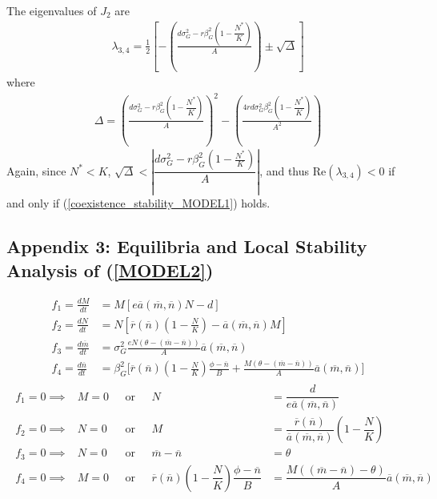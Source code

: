 \documentclass{amsart}
\theoremstyle{definition}
\theoremstyle{remark}
\numberwithin{equation}{section}
\begin{document}
\noindent The eigenvalues of $J_2$ are
\begin{align*}
	\lambda_{3,4} = \frac{1}{2}\left[-\left(\frac{d\sigma_G^2 - r\beta_G^2\left(1 - \dfrac{N^*}{K}\right)}{A}\right) \pm \sqrt{\Delta}\right]
\end{align*}
where
\begin{align*}
	\Delta = \left(\frac{d\sigma_G^2 - r\beta_G^2\left(1 - \dfrac{N^*}{K}\right)}{A}\right)^2 - \left(\frac{4rd\sigma_G^2\beta_G^2\left(1 - \dfrac{N^*}{K}\right)}{A^2}\right)
\end{align*}
Again, since $N^* < K$, $\sqrt{\Delta} < \left|\dfrac{d\sigma_G^2 - r\beta_G^2\left(1 - \frac{N^*}{K}\right)}{A}\right|$, and thus $\text{Re}(\lambda_{3,4}) < 0$ if and only if (\ref{coexistence_stability_MODEL1}) holds.

\pagebreak
\subsection{Appendix 3: Equilibria and Local Stability Analysis of (\ref{MODEL2})}
\begin{align*}
	f_1 = \frac{dM}{dt} &= M\left[e\overline{a}(\overline{m}, \overline{n})N - d\right] \\[5px]
	f_2 = \frac{dN}{dt} &= N\left[\overline{r}(\overline{n})\left(1 - \frac{N}{K}\right) - \overline{a}(\overline{m}, \overline{n})M\right] \\[5px]
	f_3 = \frac{d\overline{m}}{dt} &= \sigma_{G}^2\frac{eN(\theta - (\overline{m} - \overline{n}))}{A}\overline{a}(\overline{m}, \overline{n}) \\[5px]
	f_4 = \frac{d\overline{n}}{dt} &= \beta_{G}^2\Bigg[\overline{r}(\overline{n})\left(1 - \frac{N}{K}\right)\frac{\phi - \overline{n}}{B} + \frac{M(\theta - (\overline{m} - \overline{n}))}{A}\overline{a}(\overline{m}, \overline{n})\Bigg]
\end{align*}
\begin{align*}
	\begin{array}{cccrl}
		f_1 = 0 \implies& M = 0 \ \ \ &\text{or}&\ \ \ N &= \dfrac{d}{e\overline{a}(\overline{m}, \overline{n})} \\[10px]
		f_2 = 0 \implies& N = 0 \ \ \ &\text{or}&\ \ \ M &= \dfrac{\overline{r}(\overline{n})}{\overline{a}(\overline{m}, \overline{n})}\left(1 - \dfrac{N}{K}\right) \\[10px]
		f_3 = 0 \implies& N = 0 \ \ \ &\text{or}&\ \ \ \overline{m} - \overline{n} &= \theta \\[10px]
		f_4 = 0 \implies& M = 0 \ \ \ &\text{or}&\ \ \ \overline{r}(\overline{n})\left(1 - \dfrac{N}{K}\right)\dfrac{\phi - \overline{n}}{B} &= \dfrac{M((\overline{m} - \overline{n}) - \theta)}{A}\overline{a}(\overline{m}, \overline{n})
	\end{array}
\end{align*}
\end{document}
